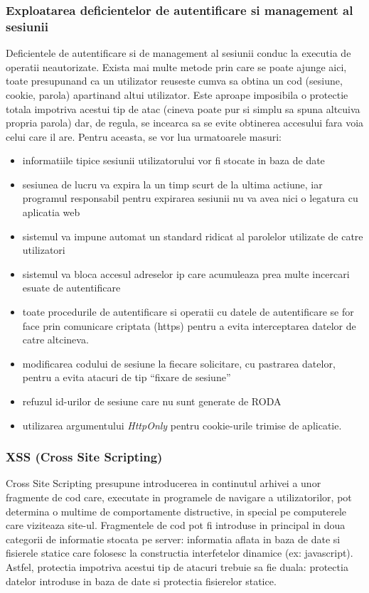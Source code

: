 \subsubsection{Exploatarea deficientelor de autentificare si management al
sesiunii}

Deficientele de autentificare si de management al sesiunii conduc la executia de operatii neautorizate. Exista mai multe
metode prin care se poate ajunge aici, toate presupunand ca un utilizator reuseste cumva sa obtina un cod (sesiune,
cookie, parola) apartinand altui utilizator. Este aproape imposibila o protectie totala impotriva acestui tip de atac
(cineva poate pur si simplu sa spuna altcuiva propria parola) dar, de regula, se incearca sa se evite obtinerea
accesului fara voia celui care il are. Pentru aceasta, se vor lua urmatoarele masuri:
\begin{itemize}
\item
informatiile tipice sesiunii utilizatorului vor fi stocate in baza de date
\item
sesiunea de lucru va expira la un timp scurt de la ultima actiune, iar programul responsabil pentru expirarea sesiunii
nu va avea nici o legatura cu aplicatia web
\item 
sistemul va impune automat un standard ridicat al parolelor utilizate de
catre utilizatori
\item 
sistemul va bloca accesul adreselor ip care acumuleaza prea multe incercari esuate de autentificare
\item
toate procedurile de autentificare si operatii cu datele de autentificare
se for face prin comunicare criptata (https) pentru a evita interceptarea datelor de catre altcineva.
\item 
modificarea codului de sesiune la fiecare solicitare, cu pastrarea datelor, pentru a evita atacuri de tip ``fixare de
sesiune''
\item
refuzul id-urilor de sesiune care nu sunt generate de RODA
\item
utilizarea argumentului \textit{HttpOnly} pentru cookie-urile
trimise de aplicatie.
\end{itemize}

\subsubsection{XSS (Cross Site Scripting)}

Cross Site Scripting presupune introducerea in continutul arhivei a unor fragmente de cod care, executate in programele
de navigare a utilizatorilor, pot determina o multime de comportamente distructive, in special pe computerele care
viziteaza site-ul. Fragmentele de cod pot fi introduse in principal in doua categorii de informatie stocata pe server:
informatia aflata in baza de date si fisierele statice care folosesc la constructia interfetelor dinamice (ex:
javascript). Astfel, protectia impotriva acestui tip de atacuri trebuie sa fie duala: protectia datelor introduse in
baza de date si protectia fisierelor statice.

